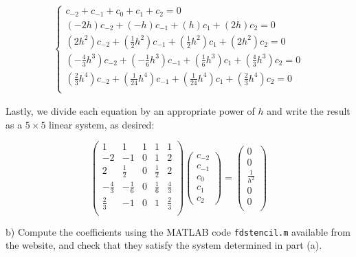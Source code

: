 \begin{solution}
    \begin{align*}
    \begin{cases}
        c_{-2} + c_{-1} + c_0 + c_1 + c_2 = 0 \\
        (-2h)c_{-2} + (-h)c_{-1} + (h)c_1 + (2h)c_2 = 0 \\
        (2h^2)c_{-2} + (\frac{1}{2}h^2)c_{-1} + (\frac{1}{2}h^2)c_1 + (2h^2)c_2 = 0 \\
        (-\frac{4}{3}h^3)c_{-2} + (-\frac{1}{6}h^3)c_{-1} + (\frac{1}{6}h^3)c_1 + (\frac{4}{3}h^3)c_2 = 0 \\
        (\frac{2}{3}h^4)c_{-2} + (\frac{1}{24}h^4)c_{-1} + (\frac{1}{24}h^4)c_1 + (\frac{2}{3}h^4)c_2 = 0 \\
    \end{cases}
    \end{align*}

    Lastly, we divide each equation by an appropriate power of $h$ and write the result as a $5 \times 5$ linear system, as desired:

    $$
    \begin{pmatrix}
        1            &           1  & 1 &           1 & 1 \\
        -2           &           -1 & 0 &           1 & 2 \\
        2            & \frac{1}{2}  & 0 & \frac{1}{2} & 2 \\
        -\frac{4}{3} & -\frac{1}{6} & 0 & \frac{1}{6} & \frac{4}{3} \\
        \frac{2}{3}  &           -1 & 0 & 1           & \frac{2}{3} \\
    \end{pmatrix}
    \begin{pmatrix}
        c_{-2} \\ c_{-1} \\ c_0 \\ c_1 \\ c_2
    \end{pmatrix}
        =
    \begin{pmatrix}
        0 \\
        0 \\
        \frac{1}{h^2} \\ 
        0 \\
        0 \\
    \end{pmatrix}
    $$
\end{solution}


b)  Compute the coefficients using the MATLAB code \texttt{fdstencil.m} available from the website, and check that they
  satisfy the system determined in part (a).



